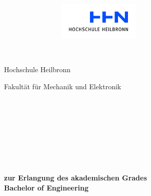 \thispagestyle{empty}

\begin{titlepage}


\begin{figure}[t]
 \centering
 \hspace{7cm}
~~~~~~~~~~
 \includegraphics[width=0.35\textwidth]{img/HHN_Logo.jpg}
\end{figure}


\begin{verbatim}


\end{verbatim}

\begin{center}
\Large{Hochschule Heilbronn}\\
\end{center}


\begin{center}
\Large{Fakultät für Mechanik und Elektronik}
\end{center}
\begin{verbatim}




\end{verbatim}
\begin{center}
\doublespacing
\textbf{\LARGE{\titleDocument}}\\
\singlespacing
\begin{verbatim}

\end{verbatim}
\textbf{\subjectDocument}
\end{center}
\begin{verbatim}

\end{verbatim}
\begin{center}

\end{center}
\begin{verbatim}

\end{verbatim}
\begin{center}
\textbf{zur Erlangung des akademischen Grades \\ Bachelor of Engineering}
\end{center}
\begin{verbatim}







\end{verbatim}
\end{titlepage}
